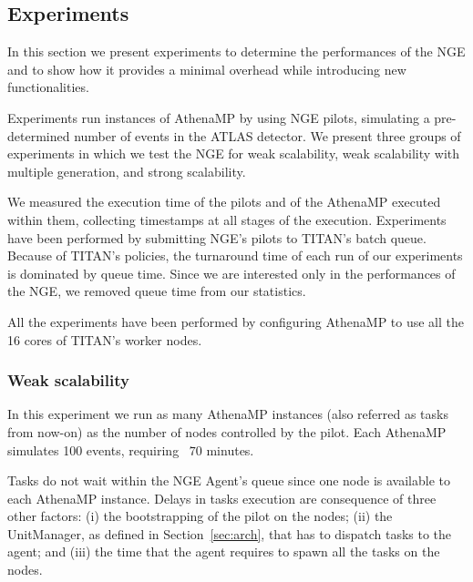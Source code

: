 
\subsection{Experiments}

In this section we present experiments %
to determine the performances of the NGE and to show how it provides a minimal
overhead while introducing new functionalities.

Experiments %
run instances of AthenaMP by using NGE pilots, %
simulating a pre-determined number of events in the ATLAS detector.
We present three groups of experiments in which we test the NGE for weak
scalability, weak scalability with multiple generation, and strong scalability.

We %
measured the execution time of the pilots and of the AthenaMP %
executed within them, collecting timestamps at %
all stages of the execution. Experiments have been performed %
by %
submitting NGE's pilots %
to TITAN's batch queue. Because of TITAN's %
policies, the turnaround time of each run of our experiments is dominated by
queue time. Since we are interested only in the performances of the NGE, we
removed queue time from our statistics.

All the experiments have been performed by %
configuring AthenaMP
to use all the 16 cores %
of TITAN's worker nodes.


\subsubsection{Weak scalability}

In this experiment %
we run as many AthenaMP instances (also referred as tasks from now-on) as the number of nodes controlled by the pilot. Each AthenaMP
simulates 100 events, requiring ~$70$ minutes.

Tasks do not %
wait within the NGE Agent's queue %
since %
one node %
is available to each AthenaMP instance. %
Delays in tasks execution are consequence of %
three other factors: (i) the bootstrapping of the pilot on the nodes; (ii) the
UnitManager, as defined in Section~\ref{sec:arch}, that has to dispatch tasks to
the agent; and (iii) the time that the agent requires to spawn all the tasks on
the nodes.


